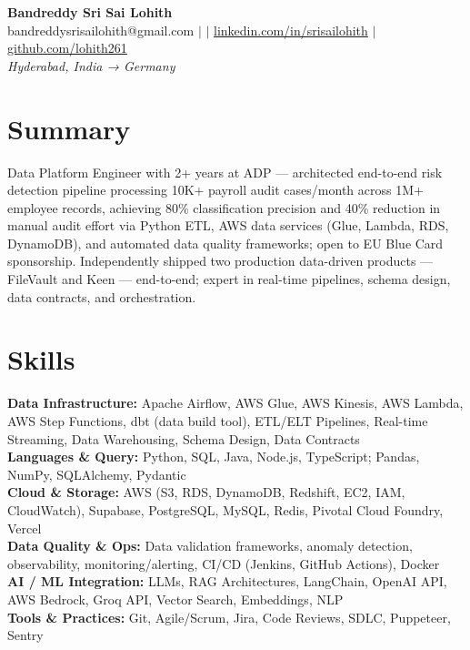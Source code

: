 \documentclass[10pt,letterpaper]{article}
\newcommand{\skillrow}[2]{\textbf{#1:} #2 \\[1pt]}
\begin{document}
\begin{center}
  {\Huge\bfseries Bandreddy Sri Sai Lohith}\\[3pt]
  \small bandreddysrisailohith@gmail.com $\vert$ $\vert$\; \href{https://linkedin.com/in/srisailohith}{linkedin.com/in/srisailohith} $\vert$\; \href{https://github.com/lohith261}{github.com/lohith261} \\[2pt]
  \small\textit{Hyderabad, India → Germany}
\end{center}

\section{Summary}

Data Platform Engineer with 2+ years at ADP --- architected end-to-end risk detection pipeline processing 10K+ payroll audit cases/month across 1M+ employee records, achieving 80\% classification precision and 40\% reduction in manual audit effort via Python ETL, AWS data services (Glue, Lambda, RDS, DynamoDB), and automated data quality frameworks; open to EU Blue Card sponsorship.
      Independently shipped two production data-driven products --- FileVault and Keen --- end-to-end; expert in real-time pipelines, schema design, data contracts, and orchestration.

\section{Skills}

\skillrow{Data Infrastructure}{Apache Airflow, AWS Glue, AWS Kinesis, AWS Lambda, AWS Step Functions, dbt (data build tool), ETL/ELT Pipelines, Real-time Streaming, Data Warehousing, Schema Design, Data Contracts}
\skillrow{Languages \& Query}{Python, SQL, Java, Node.js, TypeScript; Pandas, NumPy, SQLAlchemy, Pydantic}
\skillrow{Cloud \& Storage}{AWS (S3, RDS, DynamoDB, Redshift, EC2, IAM, CloudWatch), Supabase, PostgreSQL, MySQL, Redis, Pivotal Cloud Foundry, Vercel}
\skillrow{Data Quality \& Ops}{Data validation frameworks, anomaly detection, observability, monitoring/alerting, CI/CD (Jenkins, GitHub Actions), Docker}
\skillrow{AI / ML Integration}{LLMs, RAG Architectures, LangChain, OpenAI API, AWS Bedrock, Groq API, Vector Search, Embeddings, NLP}
\skillrow{Tools \& Practices}{Git, Agile/Scrum, Jira, Code Reviews, SDLC, Puppeteer, Sentry}
\end{document}
